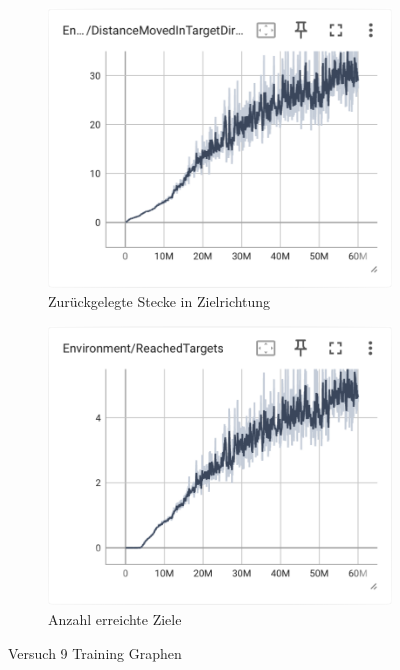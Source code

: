 \begin{figure}[H]
\begin{subfigure}{.49\textwidth}
      \label{fig:135_vel_reward}
    \end{subfigure}
    \begin{subfigure}{.49\textwidth}
      \centering  
      \includegraphics[width=\textwidth]{img/135_move_target_dir}
      \caption{Zurückgelegte Stecke in Zielrichtung}
      \label{fig:135_move_target_dir}
    \end{subfigure}
    \begin{subfigure}{.49\textwidth}
      \centering  
      \includegraphics[width=\textwidth]{img/135_reach_target}
      \caption{Anzahl erreichte Ziele}
      \label{fig:135_reach_target}
    \end{subfigure}
  \caption{Versuch 9 Training Graphen}
  \label{fig:versuch9_training}
\end{figure}

